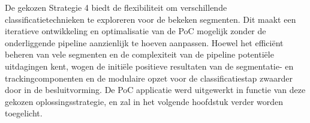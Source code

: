 De gekozen Strategie 4 biedt de flexibiliteit om verschillende classificatietechnieken te exploreren voor de bekeken segmenten.
Dit maakt een iteratieve ontwikkeling en optimalisatie van de PoC mogelijk zonder de onderliggende pipeline aanzienlijk te hoeven aanpassen.
Hoewel het efficiënt beheren van vele segmenten en de complexiteit van de pipeline potentiële uitdagingen kent, 
wogen de initiële positieve resultaten van de segmentatie- en trackingcomponenten en de modulaire opzet voor de classificatiestap zwaarder door in de besluitvorming.
De PoC applicatie werd uitgewerkt in functie van deze gekozen oplossingsstrategie, en zal in het volgende hoofdstuk verder worden toegelicht.